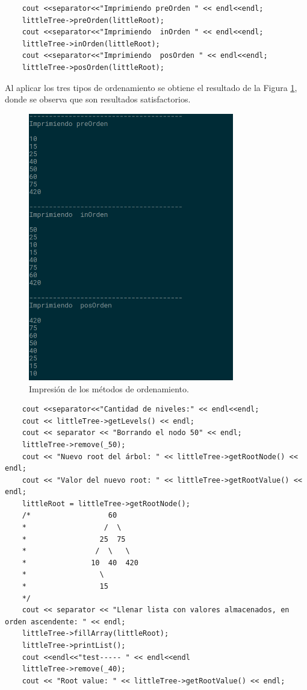 \begin{verbatim}
    cout <<separator<<"Imprimiendo preOrden " << endl<<endl;
    littleTree->preOrden(littleRoot);
    cout <<separator<<"Imprimiendo  inOrden " << endl<<endl;
    littleTree->inOrden(littleRoot);
    cout <<separator<<"Imprimiendo  posOrden " << endl<<endl;
    littleTree->posOrden(littleRoot);
    \end{verbatim}

Al aplicar los tres tipos de ordenamiento se obtiene el resultado de la Figura \ref{fig:3}, donde se observa que son resultados satisfactorios.

\begin{figure}[H]
\centering
\includegraphics[width=0.8\textwidth]{imgs/Labo9/L9-3.png}
\caption{Impresión de los métodos de ordenamiento.}
\label{fig:3}
\end{figure}


\begin{verbatim}
    cout <<separator<<"Cantidad de niveles:" << endl<<endl;
    cout << littleTree->getLevels() << endl;
    cout << separator << "Borrando el nodo 50" << endl;
    littleTree->remove(_50);
    cout << "Nuevo root del árbol: " << littleTree->getRootNode() << endl;
    cout << "Valor del nuevo root: " << littleTree->getRootValue() << endl;
    littleRoot = littleTree->getRootNode();
    /*                  60
    *                  /  \
    *                 25  75
    *                /  \   \
    *               10  40  420
    *                 \
    *                 15
    */
    cout << separator << "Llenar lista con valores almacenados, en orden ascendente: " << endl;
    littleTree->fillArray(littleRoot);
    littleTree->printList();
    cout <<endl<<"test----- " << endl<<endl
    littleTree->remove(_40);
    cout << "Root value: " << littleTree->getRootValue() << endl;
    \end{verbatim}

